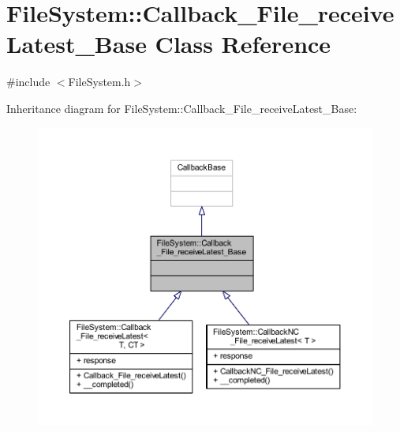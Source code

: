 \hypertarget{class_file_system_1_1_callback___file__receive_latest___base}{}\section{File\+System\+:\+:Callback\+\_\+\+File\+\_\+receive\+Latest\+\_\+\+Base Class Reference}
\label{class_file_system_1_1_callback___file__receive_latest___base}


{\ttfamily \#include $<$File\+System.\+h$>$}



Inheritance diagram for File\+System\+:\+:Callback\+\_\+\+File\+\_\+receive\+Latest\+\_\+\+Base\+:
\nopagebreak
\begin{figure}[H]
\begin{center}
\leavevmode
\includegraphics[width=350pt]{class_file_system_1_1_callback___file__receive_latest___base__inherit__graph}
\end{center}
\end{figure}



